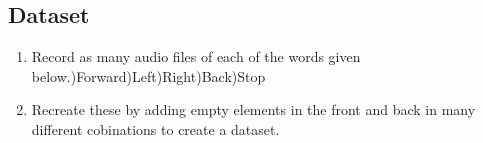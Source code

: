 \documentclass[journal,12pt,twocolumn]{IEEEtran}
\renewcommand\thesection{\arabic{section}}
\renewcommand\thesubsection{\thesection.\arabic{subsection}}
\begin{document}
%
%


\subsection{Dataset}
\begin{enumerate}[label=\thesubsection.\arabic*
,ref=\thesection.\theenumi]
\item Record as many audio files of each of the words given below.)Forward)Left)Right)Back)Stop\newline

\item Recreate these by adding empty elements in the front and back in many different cobinations to create a dataset.

\end{enumerate}
\end{document}

